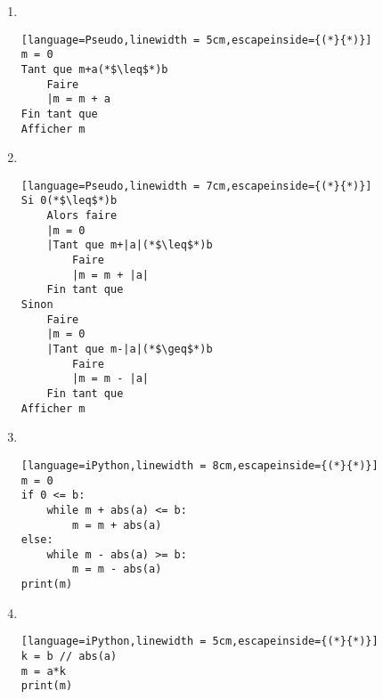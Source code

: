 \begin{correction}
	\begin{enumerate}
		\item ~
\begin{center}
	\begin{varwidth}[t]{.5\textwidth}
		\begin{lstlisting}[language=Pseudo,linewidth = 5cm,escapeinside={(*}{*)}]
m = 0
Tant que m+a(*$\leq$*)b
    Faire
    |m = m + a
Fin tant que
Afficher m
\end{lstlisting}
	\end{varwidth}
\end{center}
\item ~
\begin{center}
	\begin{varwidth}[t]{.5\textwidth}
		\begin{lstlisting}[language=Pseudo,linewidth = 7cm,escapeinside={(*}{*)}]
Si 0(*$\leq$*)b
    Alors faire
    |m = 0
    |Tant que m+|a|(*$\leq$*)b
        Faire
        |m = m + |a|
    Fin tant que
Sinon
    Faire
    |m = 0
    |Tant que m-|a|(*$\geq$*)b
        Faire
        |m = m - |a|
    Fin tant que
Afficher m
\end{lstlisting}	
	\end{varwidth}
\end{center}
\item~ 
\begin{center}
	\begin{varwidth}[t]{.5\textwidth}
		\begin{lstlisting}[language=iPython,linewidth = 8cm,escapeinside={(*}{*)}]
m = 0
if 0 <= b:
    while m + abs(a) <= b:
        m = m + abs(a)
else:
    while m - abs(a) >= b:
        m = m - abs(a)
print(m)
\end{lstlisting}	
	\end{varwidth}
\end{center}
\item ~
\begin{center}
	\begin{varwidth}[t]{.5\textwidth}
		\begin{lstlisting}[language=iPython,linewidth = 5cm,escapeinside={(*}{*)}]
k = b // abs(a)
m = a*k
print(m)
\end{lstlisting}	
	\end{varwidth}
\end{center}
\end{enumerate}
\end{correction}


